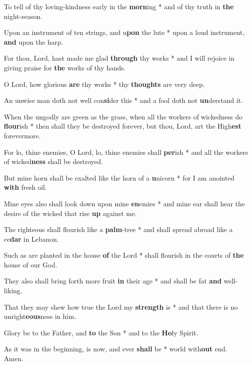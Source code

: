 \begin{multicols}{2}
	To tell of thy loving-kindness early in the \textbf{morn}ing * and of thy truth in \textbf{the} night-season.
	
	Upon an instrument of ten strings, and u\textbf{pon} the lute * upon a loud instrument, \textbf{and} upon the harp.
	
	For thou, Lord, hast made me glad \textbf{through} thy works * and I will rejoice in giving praise for \textbf{the} works of thy hands.
	
	O Lord, how glorious \textbf{are} thy works * thy \textbf{thoughts} are very deep.
	
	An unwise man doth not well con\textbf{si}der this * and a fool doth not \textbf{un}derstand it.
	
	When the ungodly are green as the grass, when all the workers of wickedness do \textbf{flour}ish * then shall they be destroyed forever, but thou, Lord, art the High\textbf{est} forevermore.
	
	For lo, thine enemies, O Lord, lo, thine enemies shall \textbf{per}ish * and all the workers of wicked\textbf{ness} shall be destroyed.
	
	But mine horn shall be exalted like the horn of a \textbf{u}nicorn * for I am anointed \textbf{with} fresh oil.
	
	Mine eyes also shall look down upon mine \textbf{en}emies * and mine ear shall hear the desire of the wicked that rise \textbf{up} against me.
	
	The righteous shall flourish like a \textbf{palm}-tree * and shall spread abroad like a ce\textbf{dar} in Lebanon.
	
	Such as are planted in the house \textbf{of} the Lord * shall flourish in the courts of \textbf{the} house of our God.
	
	They also shall bring forth more fruit \textbf{in} their age * and shall be fat \textbf{and} well-liking.
	
	That they may shew how true the Lord my \textbf{strength} is * and that there is no unright\textbf{eous}ness in him.
	
	Glory be to the Father, and \textbf{to} the Son * and to the \textbf{Ho}ly Spirit.
	
	As it was in the beginning, is now, and ever \textbf{shall} be * world with\textbf{out} end. Amen.
\end{multicols}